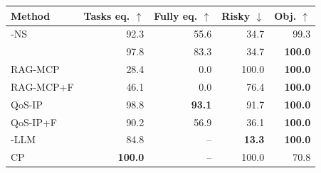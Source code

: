 \begin{tabular}{lrrrr}\toprule
Method & Tasks eq. $\uparrow$ & Fully eq. $\uparrow$ & Risky $\downarrow$ & Obj. $\uparrow$ \\ \midrule
\sysname{}-NS & 92.3 & 55.6 & 34.7 & 99.3 \\
\sysname{} & 97.8 & 83.3 & 34.7 & \textbf{100.0} \\
RAG-MCP & 28.4 & 0.0 & 100.0 & \textbf{100.0} \\
RAG-MCP+F & 46.1 & 0.0 & 76.4 & \textbf{100.0} \\
QoS-IP & 98.8 & \textbf{93.1} & 91.7 & \textbf{100.0} \\
QoS-IP+F & 90.2 & 56.9 & 36.1 & \textbf{100.0} \\
\midrule
\sysname{}-LLM & 84.8 & -- & \textbf{13.3} & \textbf{100.0} \\
CP & \textbf{100.0} & -- & 100.0 & 70.8 \\
\bottomrule\end{tabular}
